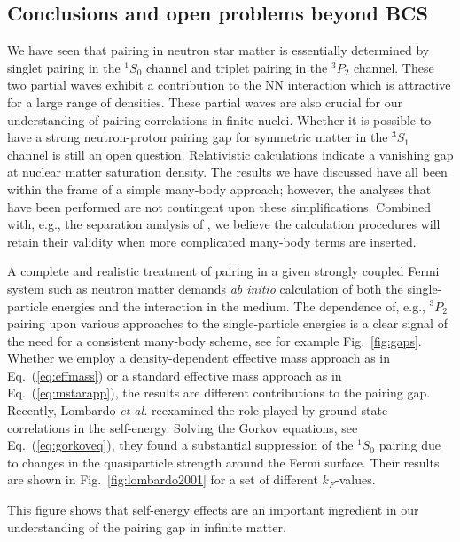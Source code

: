 \documentclass[rmp,aps,floatfix]{revtex4}
\begin{document}
\subsection{Conclusions and open problems beyond BCS}
\label{subsec:polarizationterms}

We have seen that pairing in neutron star matter is essentially
determined by singlet pairing in the $^1S_0$ channel and triplet pairing
in the $^3P_2$ channel. These two partial waves exhibit a contribution
to the NN interaction which is attractive for a large range of densities.
These partial waves are also crucial for our understanding
of pairing correlations in finite nuclei.
Whether it is possible to have a strong neutron-proton 
pairing gap for symmetric
matter in the $^3S_1$ channel is still an open question. Relativistic
calculations indicate a vanishing gap at nuclear matter saturation density.
The results we have discussed have all been within the frame of a simple
many-body approach; however, the analyses that have 
been performed are not contingent upon these simplifications. Combined with,
e.g., the separation analysis of \cite{kkc96,kkc2001,kkc1998}, we believe the 
calculation procedures will retain their validity when more 
complicated many-body terms are inserted.


A complete and realistic treatment of pairing in a given 
strongly coupled Fermi system such as neutron matter 
demands {\it ab initio} calculation of both the single-particle 
energies and the interaction in the medium. 
The dependence of, e.g., $^3P_2$ pairing upon various 
approaches to the single-particle energies is a clear signal of the need
for a consistent many-body scheme, see for example Fig.~\ref{fig:gaps}.
Whether we employ a density-dependent effective mass approach as
in Eq.~(\ref{eq:effmass}) or a standard effective mass approach as in
Eq.~(\ref{eq:mstarapp}), the results are different contributions
to the pairing gap.
Recently, Lombardo {\em et al.}  \cite{lsz2001,ls2000}
reexamined the role played by ground-state correlations in the self-energy.
Solving the Gorkov equations, see Eq.~(\ref{eq:gorkoveq}), they found a 
substantial suppression of the $^1S_0$ pairing due to changes in the 
quasiparticle strength around the Fermi surface.  
Their results are shown in Fig.~\ref{fig:lombardo2001} for a set of different 
$k_F$-values. 

This figure shows that self-energy 
effects are an important ingredient in our 
understanding of the pairing gap in infinite matter.
\end{document}

